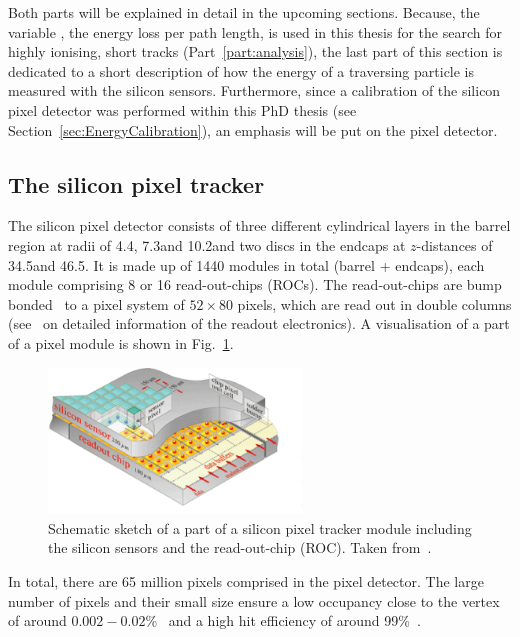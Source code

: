 Both parts will be explained in detail in the upcoming sections.
Because, the variable \dedx, the energy loss per path length, is used in this thesis for the search for highly ionising, short tracks (Part~\ref{part:analysis}), the last part of this section is dedicated to a short description of how the energy of a traversing particle is measured with the silicon sensors.
Furthermore, since a calibration of the silicon pixel detector was performed within this PhD thesis (see Section~\ref{sec:EnergyCalibration}), an emphasis will be put on the pixel detector.

\subsection*{The silicon pixel tracker}
The silicon pixel detector consists of three different cylindrical layers in the barrel region at radii of 4.4\cm, 7.3\cm and 10.2\cm and two discs in the endcaps at $z$-distances of 34.5\cm and 46.5\cm.
It is made up of 1440 modules in total (barrel + endcaps), each module comprising 8 or 16 read-out-chips (ROCs).
The read-out-chips are bump bonded~\cite{Thesis_Jenny} to a pixel system of $52\times80$ pixels, which are read out in double columns (see~\cite{Thesis_Jenny} on detailed information of the readout electronics).
A visualisation of a part of a pixel module is shown in Fig.~\ref{fig:PixelTracker}.
\begin{figure}[!b]
  \centering
      \includegraphics[width=0.60\textwidth]{figures/experiment/CMS/Pixelement.png}
  \caption{Schematic sketch of a part of a silicon pixel tracker module including the silicon sensors and the read-out-chip (ROC). Taken from~\cite{bib:PixelModule}.}  
  \label{fig:PixelTracker}
\end{figure}
In total, there are 65 million pixels comprised in the pixel detector.
The large number of pixels and their small size ensure a low occupancy close to the vertex of around $0.002 - 0.02$\%~\cite{bib:CMS:tracking_8TeV} and a high hit efficiency of around 99\%~\cite{bib:CMS:PixelSpatialResolution}. 

